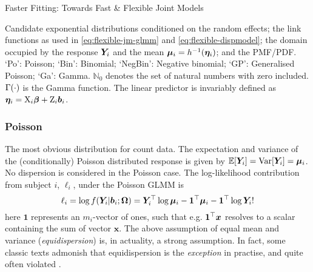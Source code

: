 \begin{chapter}{\label{cha:flexible}Faster Fitting: Towards Fast \& Flexible Joint Models}
\begin{table}[t]
\begin{center}
\begin{tblr}
    \end{tblr}
\end{center}
\caption{Candidate exponential distributions conditioned on the random effects; the link functions as used in \eqref{eq:flexible-jm-glmm} and \eqref{eq:flexible-dispmodel}; the domain occupied by the response $\bm{Y}_i$ and the mean $\bm{\mu}_i=h^{-1}\!\left(\bm{\eta}_i\right)$; and the PMF/PDF. `Po': Poisson; `Bin': Binomial; `NegBin': Negative binomial; `GP': Generalised Poisson; `Ga': Gamma. $\mathbb{N}_0$ denotes the set of natural numbers with zero included. $\Gamma\!\left(\cdot\right)$ is the Gamma function. The linear predictor is invariably defined as $\bm{\eta}_i=\mathrm{X}_i\bm{\beta}+\mathrm{Z}_i\bm{b}_i$.}
\label{tab:flexible-distribs}
\end{table}

\subsubsection*{Poisson}
The most obvious distribution for count data. The expectation and variance of the (conditionally) Poisson distributed response is given by $\operatorname{\mathbb{E}}\!\left[\bm{Y}_i\right]=\mathrm{Var}\!\left[\bm{Y}_i\right]=\bm{\mu}_i$. No dispersion is considered in the Poisson case. The log-likelihood contribution from subject $i$, $\ell_i$, under the Poisson GLMM is
\begin{equation}
    \ell_i=\log f\!\left(\bm{Y}_i|\bm{b}_i;\bm{\mathrm{\Omega}}\right)=\bm{Y}_i^\top\log\bm{\mu}_i-\bm{1}^\top\bm{\mu}_i-\bm{1}^\top\log\bm{Y}_i!
\label{eq:flexible-poisson-ll}
\end{equation}
here $\bm{1}$ represents an $m_i$-vector of ones, such that e.g. $\bm{1}^\top\bm{x}$ resolves to a scalar containing the sum of vector $\bm{x}$. The above assumption of equal mean and variance (\textit{equidispersion}) is, in actuality, a strong assumption. In fact, some classic texts admonish that equidispersion is the \textit{exception} in practise, and quite often violated \citep{McCullaghNelder89}.


\end{chapter}
